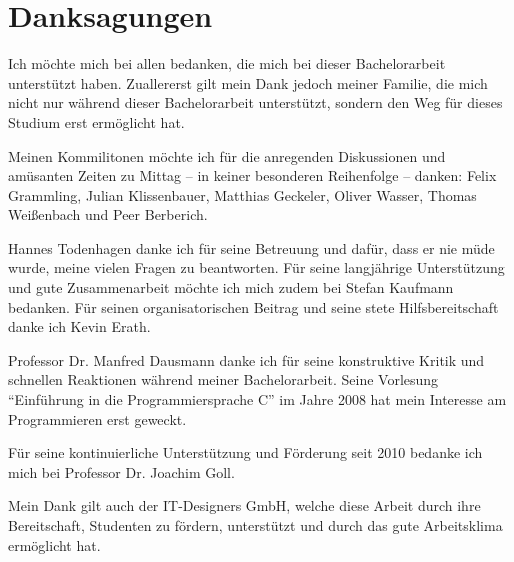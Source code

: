 
\chapter*{Danksagungen}

Ich möchte mich bei allen bedanken, die mich bei dieser Bachelorarbeit unterstützt haben.
Zuallererst gilt mein Dank jedoch meiner Familie, die mich nicht nur während dieser Bachelorarbeit unterstützt, sondern den Weg für dieses Studium erst ermöglicht hat.

Meinen Kommilitonen möchte ich für die anregenden Diskussionen und amüsanten Zeiten zu Mittag -- in keiner besonderen Reihenfolge -- danken:
Felix Grammling,
Julian Klissenbauer,
Matthias Geckeler,
Oliver Wasser,
Thomas Weißenbach und
Peer Berberich.



Hannes Todenhagen danke ich für seine Betreuung und dafür, dass er nie müde wurde, meine vielen Fragen zu beantworten.
Für seine langjährige Unterstützung und gute Zusammenarbeit möchte ich mich zudem bei Stefan Kaufmann bedanken.
Für seinen organisatorischen Beitrag und seine stete Hilfsbereitschaft danke ich Kevin Erath.

Professor Dr. Manfred Dausmann danke ich für seine konstruktive Kritik und schnellen Reaktionen während meiner Bachelorarbeit. Seine Vorlesung \enquote{Einführung in die Programmiersprache C} im Jahre 2008 hat mein Interesse am Programmieren erst geweckt.


Für seine kontinuierliche Unterstützung und Förderung seit 2010 bedanke ich mich bei Professor Dr. Joachim Goll.

Mein Dank gilt auch der IT-Designers GmbH, welche diese Arbeit durch ihre Bereitschaft, Studenten zu fördern, unterstützt und durch das gute Arbeitsklima ermöglicht hat.
